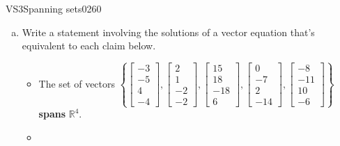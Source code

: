 \begin{exercise}{VS3}{Spanning sets}{0260} 
\begin{exerciseStatement} 

\begin{enumerate}[(a)]
\item  

 Write a statement involving the solutions of a vector equation that's equivalent to each claim below. 

 

\begin{itemize}
\item  

 The set of vectors \(\left\{ \left[\begin{array}{c}
-3 \\
-5 \\
4 \\
-4
\end{array}\right] , \left[\begin{array}{c}
2 \\
1 \\
-2 \\
-2
\end{array}\right] , \left[\begin{array}{c}
15 \\
18 \\
-18 \\
6
\end{array}\right] , \left[\begin{array}{c}
0 \\
-7 \\
2 \\
-14
\end{array}\right] , \left[\begin{array}{c}
-8 \\
-11 \\
10 \\
-6
\end{array}\right] \right\}\) \textbf{spans} \(\mathbb R^4\). 

 
\item  


\end{itemize}
\end{enumerate}
\end{exerciseStatement}
\end{exercise}
